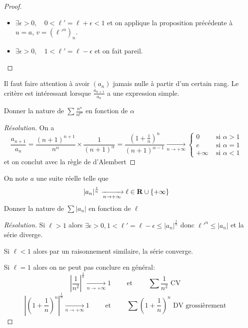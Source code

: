 \begin{proof}~
    \begin{itemize}
        \item $\exists \epsilon>0, \quad 0<\ell'=\ell+\epsilon<1$ et on applique la proposition précédente à $u=a$, $v=(\ell'^n)_n$.
        \item $\exists \epsilon > 0, \quad 1<\ell'=\ell-\epsilon$ et on fait pareil.
    \end{itemize}
\end{proof}

\begin{rem}
    Il faut faire attention à avoir $(a_n)$ jamais nulle à partir d'un certain rang. Le critère est intéressant lorsque $\frac{a_{n+1}}{a_n}$ a une expression simple.
\end{rem}

\begin{exo}
    Donner la nature de $\sum\frac{n^n}{n!^\alpha}$ en fonction de $\alpha$
\end{exo}

\begin{proof}[Résolution]
    On a \[
        \frac{a_{n+1}}{a_n}=\frac{(n+1)^{n+1}}{n^n}\times \frac1{(n+1)^\alpha}=\frac{ \left( 1+\frac1n \right)^n }{(n+1)^{\alpha-1}}\xrightarrow[n\to+\infty]{} \begin{cases}
            0&\text{ si }\alpha>1 \\ e &\text{ si }\alpha=1\\ +\infty& \text{ si }\alpha<1
        \end{cases}
    \]
    et on conclut avec la règle de d'Alembert
\end{proof}

\begin{exo}
    On note $a$ une suite réelle telle que \[
        |a_n|^{\frac1n}\xrightarrow[n\to+\infty]{}\ell\in\mathbf R\cup\{+\infty\}
    \]
    Donner la nature de $\sum |a_n|$ en fonction de $\ell$
\end{exo}

\begin{proof}[Résolution]
    Si $\ell>1$ alors $\exists \epsilon>0, 1<\ell'=\ell-\epsilon\leq |a_n|^{\frac1n}$ donc $\ell'^n\leq |a_n|$ et la série diverge.

    Si $\ell<1$ alors par un raisonnement similaire, la série converge.

    Si $\ell=1$ alors on ne peut pas conclure en général: \[
        \left| \frac1{n^2} \right|^{\frac1n}\xrightarrow[n\to+\infty]{}1\qquad\text{ et }\qquad \sum\frac1{n^2}\text{ CV }
    \]
    \[
        \left| \left( 1+\frac1n\right)^n \right|^{\frac1n}\xrightarrow[n\to+\infty]{}1\qquad \text{ et }\qquad \sum \left( 1+\frac1n \right)^{n}\text{ DV grossièrement }
    \]
\end{proof}

